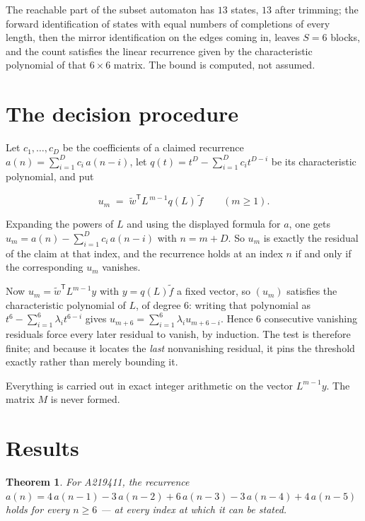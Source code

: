 \documentclass[11pt]{article}
\newtheorem{theorem}{Theorem}
\theoremstyle{definition}
\begin{document}
The reachable part of the subset automaton has $13$ states, $13$ after trimming; the forward identification of states with equal numbers of completions of every length, then the mirror identification on the edges coming in, leaves $S = 6$ blocks, and the count satisfies the linear recurrence given by the characteristic polynomial of that $6\times6$ matrix. The bound is computed, not assumed.

\section{The decision procedure}

Let $c_1,\dots,c_D$ be the coefficients of a claimed recurrence $a(n) = \sum_{i=1}^{D} c_i\,a(n-i)$, let $q(t) = t^{D} - \sum_{i=1}^{D} c_i t^{D-i}$ be its characteristic polynomial, and put

\[u_m \;=\; \tilde w^{\mathsf T} L^{\,m-1} q(L)\,\tilde f \qquad (m \ge 1).\]

Expanding the powers of $L$ and using the displayed formula for $a$, one gets $u_m = a(n) - \sum_{i=1}^{D} c_i\,a(n-i)$ with $n = m + D$. So $u_m$ is exactly the residual of the claim at that index, and the recurrence holds at an index $n$ if and only if the corresponding $u_m$ vanishes.

Now $u_m = \tilde w^{\mathsf T} L^{m-1} y$ with $y = q(L)\tilde f$ a fixed vector, so $(u_m)$ satisfies the characteristic polynomial of $L$, of degree $6$: writing that polynomial as $t^{6} - \sum_{i=1}^{6} \lambda_i t^{6-i}$ gives $u_{m+6} = \sum_{i=1}^{6} \lambda_i u_{m+6-i}$. Hence $6$ consecutive vanishing residuals force every later residual to vanish, by induction. The test is therefore finite; and because it locates the {\itshape last} nonvanishing residual, it pins the threshold exactly rather than merely bounding it.

Everything is carried out in exact integer arithmetic on the vector $L^{m-1}y$. The matrix $M$ is never formed.

\section{Results}

\begin{theorem} For A219411, the recurrence $a(n) = 4\,a(n-1) - 3\,a(n-2) + 6\,a(n-3) - 3\,a(n-4) + 4\,a(n-5)$ holds for every $n \ge 6$ --- at every index at which it can be stated.\end{theorem}
\end{document}
